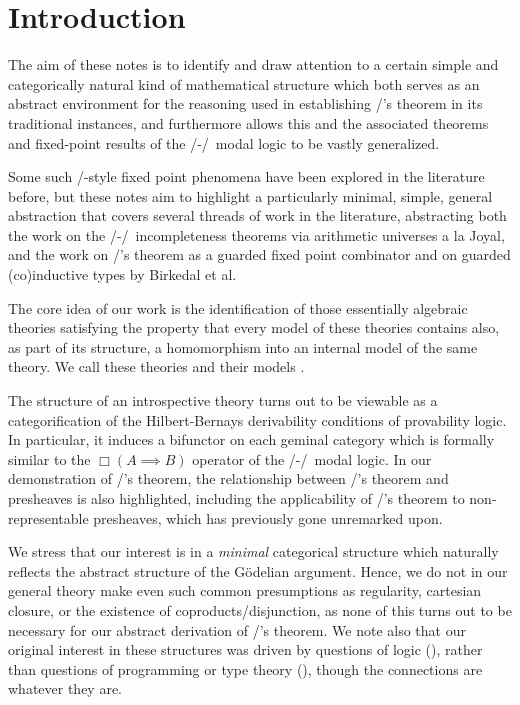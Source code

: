 \filestart

\section{Introduction}
The aim of these notes is to identify and draw attention to a certain simple and categorically natural kind of mathematical structure which both serves as an abstract environment for the reasoning used in establishing \Loeb/'s theorem in its traditional instances, and furthermore allows this and the associated theorems and fixed-point results of the \Goedel/-\Loeb/\ modal logic to be vastly generalized.

Some such \Loeb/-style fixed point phenomena have been explored in the literature before, but these notes aim to highlight a particularly minimal, simple, general abstraction that covers several threads of work in the literature, abstracting both the work on the \Goedel/-\Loeb/\ incompleteness theorems via arithmetic universes a la Joyal, and the work on \Loeb/'s theorem as a guarded fixed point combinator and on guarded (co)inductive types by Birkedal et al.

The core idea of our work is the identification of those essentially algebraic theories satisfying the property that every model of these theories contains also, as part of its structure, a homomorphism into an internal model of the same theory. We call these theories  and their models .

The structure of an introspective theory turns out to be viewable as a categorification of the Hilbert-Bernays derivability conditions of provability logic. In particular, it induces a bifunctor on each geminal category which is formally similar to the $\Box(A \implies B)$ operator of the \Goedel/-\Loeb/\ modal logic. In our demonstration of \Loeb/'s theorem, the relationship between \Loeb/'s theorem and presheaves is also highlighted, including the applicability of \Loeb/'s theorem to non-representable presheaves, which has previously gone unremarked upon.

We stress that our interest is in a \emph{minimal} categorical structure which naturally reflects the abstract structure of the G\"odelian argument. Hence, we do not in our general theory make even such common presumptions as regularity, cartesian closure, or the existence of coproducts/disjunction, as none of this turns out to be necessary for our abstract derivation of \Loeb/'s theorem. We note also that our original interest in these structures was driven by questions of logic (), rather than questions of programming or type theory (), though the connections are whatever they are.

